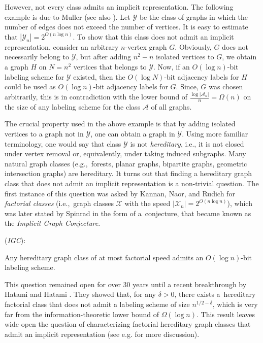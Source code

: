\documentclass[letterpaper,11pt]{article}
\newcommand{\Ac}{\mathcal{A}}
\newcommand{\Yc}{\mathcal{Y}}
\theoremstyle{definition}
\theoremstyle{remark}
\begin{document}
	However, not every class admits an implicit representation. The following example is due to Muller \cite{Muller88} (see also \cite{Spinrad03}). Let $\Yc$ be the class of graphs in which the number of edges
	does not exceed the number of vertices. It is easy to estimate that $|\Yc_n| = 2^{O(n \log n)}$. To show that this class
	does not admit an implicit representation, consider an arbitrary $n$-vertex graph $G$. Obviously, $G$ does not necessarily belong to $\Yc$, but after adding $n^2-n$ isolated vertices to $G$, we obtain a graph $H$ on $N=n^2$ vertices that belongs to $\Yc$.
	Now, if an $O(\log n)$-bit labeling scheme for $\Yc$ existed, then the $O(\log N)$-bit adjacency labels for $H$ could be used
	as $O(\log n)$-bit adjacency labels for $G$. Since, $G$ was chosen arbitrarily, this is in contradiction with the lower bound of 
	$\frac{\log |\Ac_n|}{n} = \Omega(n)$ on the size of any labeling scheme for the class $\Ac$ of all graphs.
	
	The crucial property used in the above example is that by adding isolated vertices to a graph not in $\Yc$, one can obtain a graph in $\Yc$.
	Using more familiar terminology, one would say that class $\Yc$ is not \emph{hereditary}, i.e., it is not closed under vertex removal or, equivalently, under taking induced subgraphs. Many natural graph classes (e.g.,\ forests, planar graphs, bipartite graphs, geometric intersection graphs) are hereditary. 
	It turns out that finding a hereditary graph class that does not admit an implicit representation is a non-trivial question. The first instance of this question was asked by 	Kannan, Naor, and Rudich \cite{KNR88} for \textit{factorial classes} (i.e.,~graph classes $\mathcal{X}$ with the speed $|\mathcal{X}_n|=2^{O(n\log n )}$), which was later stated by Spinrad \cite{Spinrad03} in the form of a~conjecture, that became known as the \emph{Implicit Graph Conjecture}.
	
	\begin{labeling}{(\textit{IGC}):}
		\item[(\textit{IGC}):] Any hereditary graph class of at most factorial speed admits an $O(\log n)$-bit labeling scheme.
	\end{labeling}
	

	This question remained open for over 30 years until
	a recent breakthrough by Hatami and Hatami \cite{HH22}.
	They showed that, for any $\delta > 0$, there exists a~hereditary factorial class that does not admit a labeling scheme of size $n^{1/2-\delta}$, which is very far from the information-theoretic lower bound of $\Omega(\log n)$.
	This result leaves wide open the question of characterizing factorial hereditary graph classes that admit an implicit representation 
	(see e.g. \cite{HWZ22} for more discussion).
	
\end{document}

